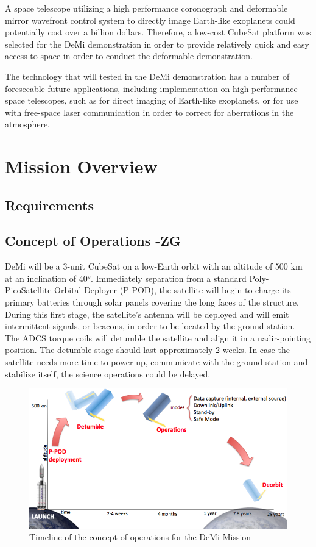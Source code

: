 \documentclass[12pt]{article}
\begin{document}
A space telescope utilizing a high performance coronograph and deformable mirror wavefront control system to directly image Earth-like exoplanets could potentially cost over a billion dollars.  Therefore, a low-cost CubeSat platform was selected for the DeMi demonstration in order to provide relatively quick and easy access to space in order to conduct the deformable demonstration. 

The technology that will tested in the DeMi demonstration has a number of foreseeable future applications, including implementation on high performance space telescopes, such as for direct imaging of Earth-like exoplanets, or for use with free-space laser communication in order to correct for aberrations in the atmosphere. 


\section{Mission Overview}
		\subsection{Requirements}
		\subsection{Concept of Operations -ZG}
		
		DeMi will be a 3-unit CubeSat on a low-Earth orbit with an altitude of 500 km at an inclination of 40°. Immediately separation from a standard Poly-PicoSatellite Orbital Deployer (P-POD), the satellite will begin to charge its primary batteries through solar panels covering the long faces of the structure. During this first stage, the satellite’s antenna will be deployed and will emit intermittent signals, or beacons, in order to be located by the ground station. The ADCS torque coils will detumble the satellite and align it in a nadir-pointing position. The detumble stage should last approximately 2 weeks. In case the satellite needs more time to power up, communicate with the ground station and stabilize itself, the science operations could be delayed. 
		
		\begin{figure}[!ht]
				\centering
				\includegraphics[width=5in]{images/MissionOverview_1.png}
				\caption{Timeline of the concept of operations for the DeMi Mission}
				\label{fig:Mission_ConOps}
			\end{figure}
		
\end{document}
